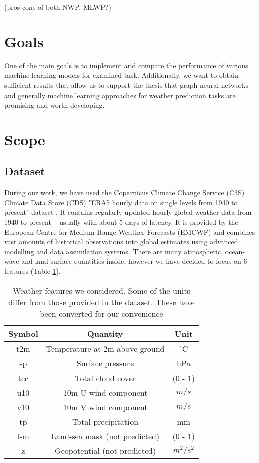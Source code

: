 (pros cons of both NWP, MLWP?)

\section{Goals}
One of the main goals is to implement and compare the performance of various machine learning models for examined task. Additionally, we want to obtain sufficient results that allow us to support the thesis that graph neural networks and generally machine learning approaches for weather prediction tasks are promising and worth developing.

\section{Scope}
\subsection{Dataset}
During our work, we have used the Copernicus Climate Change Service (C3S) Climate Data Store (CDS) "ERA5 hourly data on single levels from 1940 to present" dataset \cite{ERA5}. It contains regularly updated hourly global weather data from 1940 to present -- usually with about 5 days of latency. It is provided by the European Centre for Medium-Range Weather Forecasts (EMCWF) and combines vast amounts of historical observations into global estimates using advanced modelling and data assimilation systems. There are many atmospheric, ocean-wave and land-surface quantities inside, however we have decided to focus on 6 features (Table \ref{tab:data_features}).

\begin{table}[!ht]
\centering
\begin{tabular}{|c|c|c|}
     \hline
     Symbol & Quantity & Unit \\
     \hline
     t2m & Temperature at 2m above ground & $^{\circ}$C \\
     sp & Surface pressure & hPa \\
     tcc & Total cloud cover & (0 - 1) \\
     u10 & 10m U wind component & $m/s$ \\
     v10 & 10m V wind component & $m/s$ \\
     tp & Total precipitation & mm \\
     \hline
     lsm & Land-sea mask (not predicted) & (0 - 1) \\
     z & Geopotential (not predicted) & $m^2/s^2$ \\
     \hline
\end{tabular}
\caption{Weather features we considered. Some of the units differ from those provided in the dataset. These have been converted for our convenience}
\label{tab:data_features}
\end{table}

